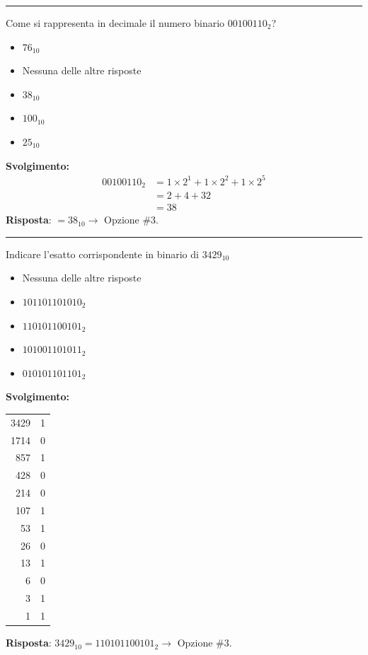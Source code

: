 \documentclass[12pt, a4paper]{article}
\begin{document}
\vspace{0.5cm}
\hrule
\vspace{0.5cm}

Come si rappresenta in decimale il numero binario $00100110_2$?
\begin{itemize}
    \item[$\square$] $76_{10}$
    \item[$\square$] Nessuna delle altre risposte
    \item[$\blacksquare$] $38_{10}$
    \item[$\square$] $100_{10}$
    \item[$\square$] $25_{10}$
\end{itemize}

\textbf{Svolgimento:}
\begin{align*}
00100110_2 &= 1\times2^{1} + 1\times2^{2} + 1\times2^{5} \\
&= 2 + 4 + 32 \\
&= 38
\end{align*}
\textbf{Risposta}: $=38_{10} \rightarrow$ Opzione \#3.

\vspace{0.5cm}
\hrule
\vspace{0.5cm}

Indicare l'esatto corrispondente in binario di $3429_{10}$
\begin{itemize}
    \item[$\square$] Nessuna delle altre risposte
    \item[$\square$] $101101101010_2$
    \item[$\blacksquare$] $110101100101_2$
    \item[$\square$] $101001101011_2$
    \item[$\square$] $010101101101_2$
\end{itemize}

\textbf{Svolgimento:}
\begin{center}
\begin{tabular}{r|c}
3429 & 1 \\
1714 & 0 \\
857 & 1 \\
428 & 0 \\
214 & 0 \\
107 & 1 \\
53 & 1 \\
26 & 0 \\
13 & 1 \\
6 & 0 \\
3 & 1 \\
1 & 1
\end{tabular}
\end{center}
\textbf{Risposta}: $3429_{10} = 110101100101_2 \rightarrow$ Opzione \#3.
\end{document}
